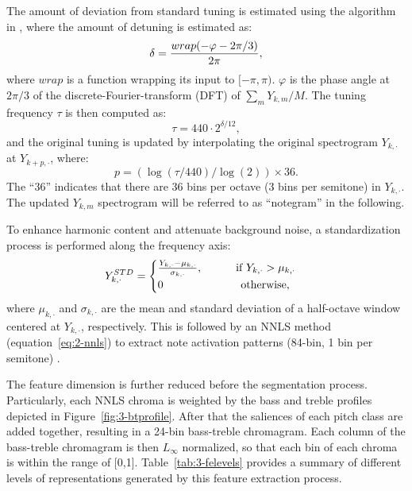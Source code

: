 The amount of deviation from standard tuning is estimated using the algorithm in \cite{dressler2007tuning}, where the amount of detuning is estimated as:
\begin{equation}\label{eq:3-tuning}
	\delta = { {wrap(-\varphi-{2\pi}/3)} \over {2\pi} },
\end{equation}
where $wrap$ is a function wrapping its input to $[-\pi,\pi)$. $\varphi$ is the phase angle at $2\pi/3$ of the discrete-Fourier-transform (DFT) of ${\sum_m Y_{k,m}} / M$. The tuning frequency $\tau$ is then computed as:
\begin{equation}
\tau=440\cdot2^{\delta/12},
\end{equation}
and the original tuning is updated by interpolating the original spectrogram $Y_{k,\cdot}$ at $Y_{{k+p},\cdot}$, where:
\begin{equation}
p = (\log(\tau / 440) / \log(2)) \times 36.
\end{equation}
The ``36'' indicates that there are 36 bins per octave (3 bins per semitone) in $Y_{k,\cdot}$. The updated $Y_{k,m}$ spectrogram will be referred to as ``notegram'' in the following.

To enhance harmonic content and attenuate background noise, a standardization process is performed along the frequency axis:
\begin{equation}
Y^{STD}_{k,\cdot} = 
\begin{cases}
{{Y_{k,\cdot} - \mu_{k,\cdot}} \over \sigma_{k,\cdot}}, \text{\quad\quad\quad if } Y_{k,\cdot} > \mu_{k,\cdot}\\
0 \quad\quad\quad\quad\quad\quad\quad\text{otherwise,}
\end{cases}
\end{equation}
where $\mu_{k,\cdot}$ and $\sigma_{k,\cdot}$ are the mean and standard deviation of a half-octave window centered at $Y_{k,\cdot}$, respectively. This is followed by an NNLS method  (equation~\ref{eq:2-nnls}) to extract note activation patterns (84-bin, 1 bin per semitone) \cite{mauch2010approximate}.

The feature dimension is further reduced before the segmentation process. Particularly, each NNLS chroma is weighted by the bass and treble profiles depicted in Figure~\ref{fig:3-btprofile}. After that the saliences of each pitch class are added together, resulting in a 24-bin bass-treble chromagram. Each column of the bass-treble chromagram is then $L_\infty$ normalized, so that each bin of each chroma is within the range of [0,1]. Table~\ref{tab:3-felevels} provides a summary of different levels of representations generated by this feature extraction process.

